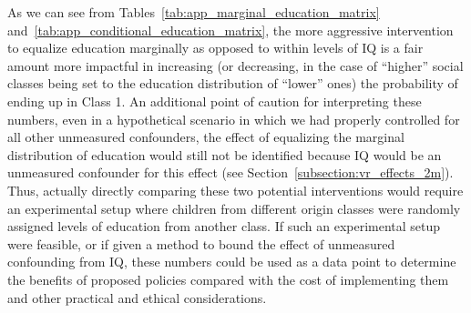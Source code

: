 As we can see from Tables~\ref{tab:app_marginal_education_matrix} and~\ref{tab:app_conditional_education_matrix}, the more aggressive 
intervention to equalize education marginally as opposed to
within levels of IQ is a fair amount more impactful in increasing (or decreasing, in the case of ``higher'' social classes
being set to the education distribution of ``lower'' ones) the probability of ending up in Class 1. An additional point of caution
for interpreting these numbers, even in a hypothetical scenario in which we had properly controlled for all other unmeasured confounders,
the effect of equalizing the marginal distribution of education would still not be identified because IQ would be an unmeasured confounder
for this effect (see Section~\ref{subsection:vr_effects_2m}). Thus, actually directly comparing these two potential interventions would 
require an experimental setup where children from different origin classes were randomly assigned levels of education from another class. 
If such an experimental setup were feasible, or if given a method to bound the effect of unmeasured confounding from IQ, these numbers could be 
used as a data point to determine the benefits of proposed policies compared with the cost of implementing them and other 
practical and ethical considerations. 

